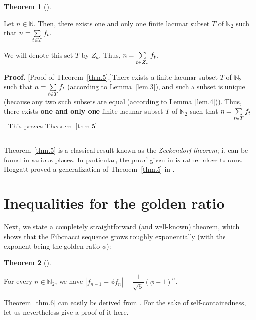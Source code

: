 \documentclass[numbers=enddot,12pt,final,onecolumn,notitlepage]{scrartcl}%
\numberwithin{exer}{section}
\theoremstyle{definition}
\newtheorem{theo}{Theorem}[section]
\newenvironment{theorem}[1][]
{\begin{theo}[#1]\begin{leftbar}}
{\end{leftbar}\end{theo}}
\newenvironment{proof}[1][Proof]{\noindent\textbf{#1.} }{\ \rule{0.5em}{0.5em}}
\let\sumnonlimits\sum
\renewcommand{\sum}{\sumnonlimits\limits}
\begin{document}
\begin{theorem}
[Zeckendorf theorem]\label{thm.5} Let $n \in\mathbb{N}$. Then, there exists
one and only one finite lacunar subset $T$ of $\mathbb{N}_{2}$ such that
$n=\sum\limits_{t\in T}f_{t}$.

We will denote this set $T$ by $Z_{n}$. Thus, $n=\sum\limits_{t\in Z_{n}}%
f_{t}$.
\end{theorem}

\begin{proof}
[Proof of Theorem~\ref{thm.5}.]There exists a finite lacunar subset $T$ of
$\mathbb{N}_{2}$ such that $n=\sum\limits_{t\in T}f_{t}$ (according to
Lemma~\ref{lem.3}), and such a subset is unique (because any two such subsets
are equal (according to Lemma~\ref{lem.4})). Thus, there exists \textbf{one
and only one} finite lacunar subset $T$ of $\mathbb{N}_{2}$ such that
$n=\sum\limits_{t\in T}f_{t}$. This proves Theorem~\ref{thm.5}.
\end{proof}

Theorem~\ref{thm.5} is a classical result known as the \textit{Zeckendorf
theorem}; it can be found in various places. In particular, the proof given in
\cite{Hender16} is rather close to ours. Hoggatt proved a generalization of
Theorem~\ref{thm.5} in \cite{Hoggat72}.

\section{Inequalities for the golden ratio}

Next, we state a completely straightforward (and well-known) theorem, which
shows that the Fibonacci sequence grows roughly exponentially (with the
exponent being the golden ratio $\phi$):

\begin{theorem}
\label{thm.6} For every $n\in\mathbb{N}_{2}$, we have $\left\vert f_{n+1}-\phi
f_{n}\right\vert =\dfrac{1}{\sqrt{5}}\left(  \phi-1\right)  ^{n}$.
\end{theorem}

Theorem~\ref{thm.6} can easily be derived from \cite[Chapter 9, Corollary
34]{BenQui03}. For the sake of self-containedness, let us nevertheless give a
proof of it here.
\end{document}
